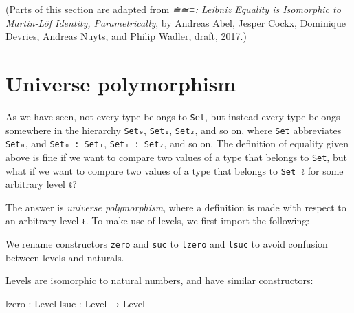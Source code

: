 (Parts of this section are adapted from \emph{≐≃≡: Leibniz Equality is
Isomorphic to Martin-Löf Identity, Parametrically}, by Andreas Abel,
Jesper Cockx, Dominique Devries, Andreas Nuyts, and Philip Wadler,
draft, 2017.)

\hypertarget{Equality-unipoly}{%
\section{Universe polymorphism}\label{Equality-unipoly}}

As we have seen, not every type belongs to \texttt{Set}, but instead
every type belongs somewhere in the hierarchy \texttt{Set₀},
\texttt{Set₁}, \texttt{Set₂}, and so on, where \texttt{Set} abbreviates
\texttt{Set₀}, and \texttt{Set₀\ :\ Set₁}, \texttt{Set₁\ :\ Set₂}, and
so on. The definition of equality given above is fine if we want to
compare two values of a type that belongs to \texttt{Set}, but what if
we want to compare two values of a type that belongs to \texttt{Set\ ℓ}
for some arbitrary level \texttt{ℓ}?

The answer is \emph{universe polymorphism}, where a definition is made
with respect to an arbitrary level \texttt{ℓ}. To make use of levels, we
first import the following:

\begin{fence}
\begin{code}%
\>[0]\AgdaSpace{}%
\AgdaSpace{}%
\AgdaSpace{}%
\AgdaSpace{}%
\AgdaSymbol{(}\AgdaSymbol{;}\AgdaSpace{}%
\AgdaSymbol{)}\AgdaSpace{}%
\AgdaSpace{}%
\AgdaSymbol{(}\AgdaSpace{}%
\AgdaSpace{}%
\AgdaSymbol{;}\AgdaSpace{}%
\AgdaSpace{}%
\AgdaSpace{}%
\AgdaSymbol{)}\<%
\end{code}
\end{fence}

We rename constructors \texttt{zero} and \texttt{suc} to \texttt{lzero}
and \texttt{lsuc} to avoid confusion between levels and naturals.

Levels are isomorphic to natural numbers, and have similar constructors:

\begin{myDisplay}
lzero : Level
lsuc  : Level → Level
\end{myDisplay}

